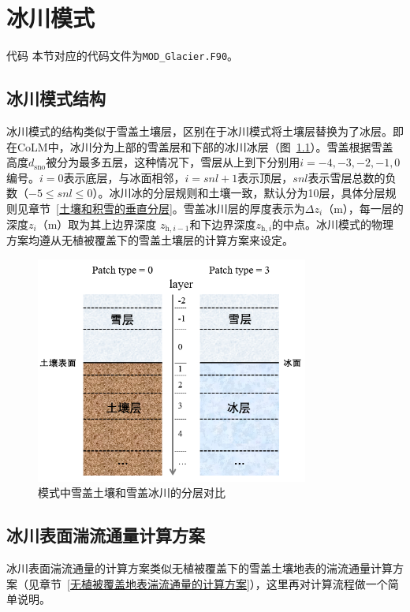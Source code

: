 \chapter{冰川模式}
\begin{mymdframed}{代码}
  本节对应的代码文件为\texttt{MOD\_Glacier.F90}。
\end{mymdframed}
\section{冰川模式结构}
冰川模式的结构类似于雪盖土壤层，区别在于冰川模式将土壤层替换为了冰层。即在CoLM中，冰川分为上部的雪盖层和下部的冰川冰层（图~\ref{fig:模式中雪盖土壤和雪盖冰川的分层对比}）。雪盖根据雪盖高度$d_{\mathrm{sno}}$被分为最多五层，这种情况下，雪层从上到下分别用$i=-4,-3,-2,-1,0$编号。$i=0$表示底层，与冰面相邻，$i=snl+1$表示顶层，$snl$表示雪层总数的负数（$-5\leqslant snl\leqslant 0$）。冰川冰的分层规则和土壤一致，默认分为10层，具体分层规则见章节~\ref{土壤和积雪的垂直分层}。雪盖冰川层的厚度表示为$\Delta z_i$（m），每一层的深度$z_i$（m）取为其上边界深度 $z_{\mathrm{h},i-1}$和下边界深度$z_{\mathrm{h},i}$的中点。冰川模式的物理方案均遵从无植被覆盖下的雪盖土壤层的计算方案来设定。

{
  \begin{figure}[htbp]
    \centering
    \includegraphics[width=0.8\textwidth]{Figures/冰川模式/模式中雪盖土壤和雪盖冰川的分层对比.jpg}
    \caption{模式中雪盖土壤和雪盖冰川的分层对比}
    \label{fig:模式中雪盖土壤和雪盖冰川的分层对比}
  \end{figure}
}

\section{冰川表面湍流通量计算方案}
冰川表面湍流通量的计算方案类似无植被覆盖下的雪盖土壤地表的湍流通量计算方案（见章节~\ref{无植被覆盖地表湍流通量的计算方案}），这里再对计算流程做一个简单说明。

